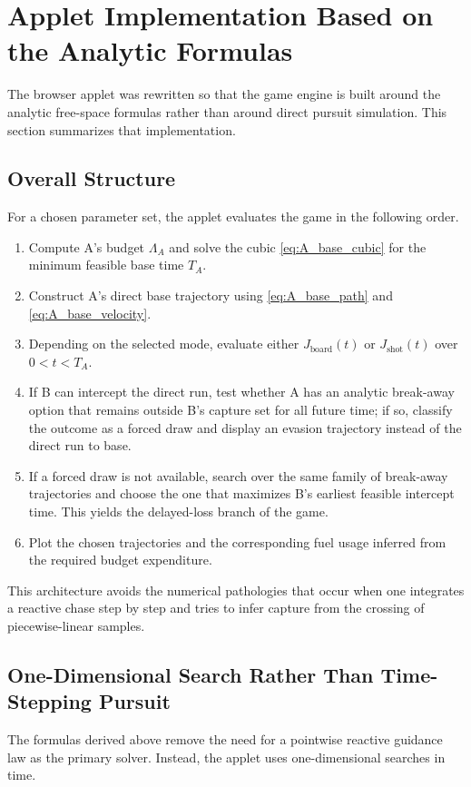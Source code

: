\documentclass[journal, a4paper]{IEEEtran}
\begin{document}
\section{Applet Implementation Based on the Analytic Formulas}
The browser applet was rewritten so that the game engine is built around the analytic free-space formulas rather than around direct pursuit simulation. This section summarizes that implementation.

\subsection{Overall Structure}
For a chosen parameter set, the applet evaluates the game in the following order.
\begin{enumerate}
\item Compute A's budget $\Lambda_A$ and solve the cubic \eqref{eq:A_base_cubic} for the minimum feasible base time $T_A$.
\item Construct A's direct base trajectory using \eqref{eq:A_base_path} and \eqref{eq:A_base_velocity}.
\item Depending on the selected mode, evaluate either $J_{\mathrm{board}}(t)$ or $J_{\mathrm{shot}}(t)$ over $0<t<T_A$.
\item If B can intercept the direct run, test whether A has an analytic break-away option that remains outside B's capture set for all future time; if so, classify the outcome as a forced draw and display an evasion trajectory instead of the direct run to base.
\item If a forced draw is not available, search over the same family of break-away trajectories and choose the one that maximizes B's earliest feasible intercept time. This yields the delayed-loss branch of the game.
\item Plot the chosen trajectories and the corresponding fuel usage inferred from the required budget expenditure.
\end{enumerate}

This architecture avoids the numerical pathologies that occur when one integrates a reactive chase step by step and tries to infer capture from the crossing of piecewise-linear samples.

\subsection{One-Dimensional Search Rather Than Time-Stepping Pursuit}
The formulas derived above remove the need for a pointwise reactive guidance law as the primary solver. Instead, the applet uses one-dimensional searches in time.
\end{document}
